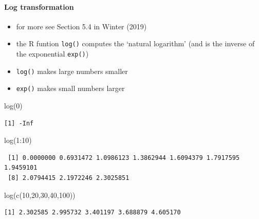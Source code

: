 \documentclass[
  letterpaper,
  DIV=11,
  numbers=noendperiod]{scrartcl}
\let\oldparagraph\paragraph
\renewcommand{\paragraph}[1]{\oldparagraph{#1}\mbox{}}
\newenvironment{Shaded}{\begin{snugshade}}{\end{snugshade}}
\newcommand{\DecValTok}[1]{\textcolor[rgb]{0.68,0.00,0.00}{#1}}
\newcommand{\FunctionTok}[1]{\textcolor[rgb]{0.28,0.35,0.67}{#1}}
\newcommand{\NormalTok}[1]{\textcolor[rgb]{0.00,0.23,0.31}{#1}}
\newcommand{\SpecialCharTok}[1]{\textcolor[rgb]{0.37,0.37,0.37}{#1}}
\begin{document}
\hypertarget{log-transformation}{%
\paragraph{Log transformation}\label{log-transformation}}

\begin{itemize}
\item
  for more see Section 5.4 in Winter (2019)
\item
  the R funtion \texttt{log()} computes the `natural logarithm' (and is
  the inverse of the exponential \texttt{exp()})
\item
  \texttt{log()} makes large numbers smaller
\item
  \texttt{exp()} makes small numbers larger
\end{itemize}

\begin{Shaded}
\begin{Highlighting}[]
\FunctionTok{log}\NormalTok{(}\DecValTok{0}\NormalTok{)}
\end{Highlighting}
\end{Shaded}

\begin{verbatim}
[1] -Inf
\end{verbatim}

\begin{Shaded}
\begin{Highlighting}[]
\FunctionTok{log}\NormalTok{(}\DecValTok{1}\SpecialCharTok{:}\DecValTok{10}\NormalTok{)}
\end{Highlighting}
\end{Shaded}

\begin{verbatim}
 [1] 0.0000000 0.6931472 1.0986123 1.3862944 1.6094379 1.7917595 1.9459101
 [8] 2.0794415 2.1972246 2.3025851
\end{verbatim}

\begin{Shaded}
\begin{Highlighting}[]
\FunctionTok{log}\NormalTok{(}\FunctionTok{c}\NormalTok{(}\DecValTok{10}\NormalTok{,}\DecValTok{20}\NormalTok{,}\DecValTok{30}\NormalTok{,}\DecValTok{40}\NormalTok{,}\DecValTok{100}\NormalTok{))}
\end{Highlighting}
\end{Shaded}

\begin{verbatim}
[1] 2.302585 2.995732 3.401197 3.688879 4.605170
\end{verbatim}
\end{document}
